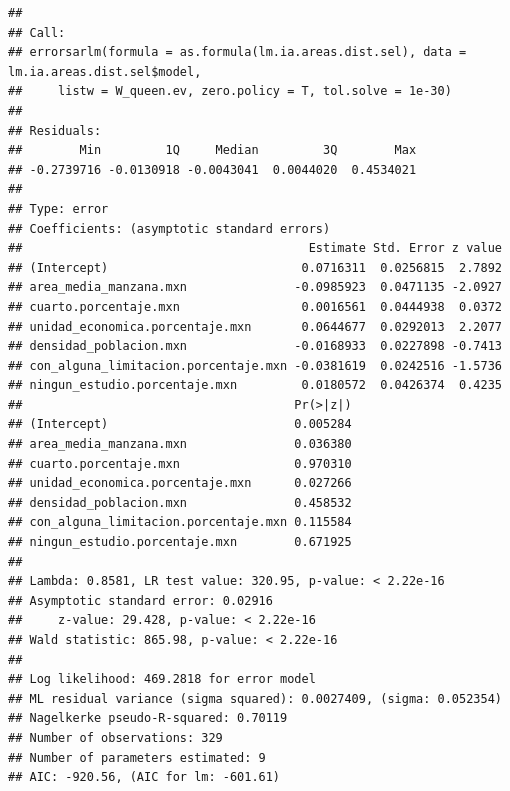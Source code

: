\documentclass[12pt,]{book}
\newenvironment{Shaded}{\begin{snugshade}}{\end{snugshade}}
\newcommand{\KeywordTok}[1]{\textcolor[rgb]{0.13,0.29,0.53}{\textbf{#1}}}
\newcommand{\DataTypeTok}[1]{\textcolor[rgb]{0.13,0.29,0.53}{#1}}
\newcommand{\FloatTok}[1]{\textcolor[rgb]{0.00,0.00,0.81}{#1}}
\newcommand{\StringTok}[1]{\textcolor[rgb]{0.31,0.60,0.02}{#1}}
\newcommand{\CommentTok}[1]{\textcolor[rgb]{0.56,0.35,0.01}{\textit{#1}}}
\newcommand{\OperatorTok}[1]{\textcolor[rgb]{0.81,0.36,0.00}{\textbf{#1}}}
\newcommand{\NormalTok}[1]{#1}
\begin{document}
\begin{verbatim}
## 
## Call:
## errorsarlm(formula = as.formula(lm.ia.areas.dist.sel), data = lm.ia.areas.dist.sel$model, 
##     listw = W_queen.ev, zero.policy = T, tol.solve = 1e-30)
## 
## Residuals:
##        Min         1Q     Median         3Q        Max 
## -0.2739716 -0.0130918 -0.0043041  0.0044020  0.4534021 
## 
## Type: error 
## Coefficients: (asymptotic standard errors) 
##                                        Estimate Std. Error z value
## (Intercept)                           0.0716311  0.0256815  2.7892
## area_media_manzana.mxn               -0.0985923  0.0471135 -2.0927
## cuarto.porcentaje.mxn                 0.0016561  0.0444938  0.0372
## unidad_economica.porcentaje.mxn       0.0644677  0.0292013  2.2077
## densidad_poblacion.mxn               -0.0168933  0.0227898 -0.7413
## con_alguna_limitacion.porcentaje.mxn -0.0381619  0.0242516 -1.5736
## ningun_estudio.porcentaje.mxn         0.0180572  0.0426374  0.4235
##                                      Pr(>|z|)
## (Intercept)                          0.005284
## area_media_manzana.mxn               0.036380
## cuarto.porcentaje.mxn                0.970310
## unidad_economica.porcentaje.mxn      0.027266
## densidad_poblacion.mxn               0.458532
## con_alguna_limitacion.porcentaje.mxn 0.115584
## ningun_estudio.porcentaje.mxn        0.671925
## 
## Lambda: 0.8581, LR test value: 320.95, p-value: < 2.22e-16
## Asymptotic standard error: 0.02916
##     z-value: 29.428, p-value: < 2.22e-16
## Wald statistic: 865.98, p-value: < 2.22e-16
## 
## Log likelihood: 469.2818 for error model
## ML residual variance (sigma squared): 0.0027409, (sigma: 0.052354)
## Nagelkerke pseudo-R-squared: 0.70119 
## Number of observations: 329 
## Number of parameters estimated: 9 
## AIC: -920.56, (AIC for lm: -601.61)
\end{verbatim}

\begin{Shaded}
\end{Shaded}
\end{document}
